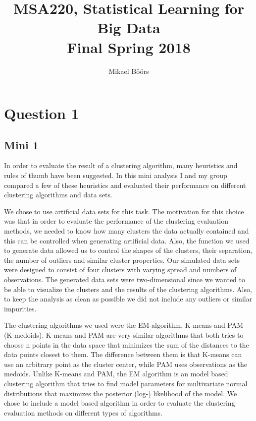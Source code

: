 \documentclass[11pt,twoside,swedish]{article}
\begin{document}
\title{MSA220, Statistical Learning for Big Data\\
  Final Spring 2018}
\author{Mikael B\"o\"ors}

\clearpage
\maketitle
\thispagestyle{empty}

\newpage
\clearpage
\tableofcontents
\thispagestyle{empty}
\newpage

\setcounter{page}{1}

\section{Question 1}\label{Question 1}

\subsection{Mini 1}\label{Mini 1}

In order to evaluate the result of a clustering algorithm, many heuristics and
rules of thumb have been suggested. In this mini analysis I and my
group compared a few of these heuristics and evaluated their
performance on different clustering algorithms and data sets.

We chose to use artificial data sets for this task. The motivation for
this choice was that in order to evaluate the performance of the
clustering evaluation methods, we needed to know how many clusters the
data actually contained and this can be controlled when generating
artificial data. Also, the function we used to generate data allowed
us to control the shapes of the clusters, their separation, the number
of outliers and similar cluster properties. Our simulated data sets
were designed to consist of four clusters with varying spread and
numbers of observations. The generated data sets were two-dimensional
since we wanted to be able to visualize the clusters and the results
of the clustering algorithms. Also, to keep the analysis as clean as
possible we did not include any outliers or similar impurities.

The clustering algorithms we used were the EM-algorithm, K-means and
PAM (K-medoids). K-means and PAM are very similar algorithms that both
tries to choose n points in the data space that minimizes the sum of the
distances to the data points closest to them. The difference between
them is that K-means can use an arbitrary point as the cluster center,
while PAM uses observations as the medoids. Unlike K-means and PAM,
the EM algorithm is an model based clustering algorithm that tries to
find model parameters for multivariate normal distributions that
maximizes the posterior (log-) likelihood of the model. We chose to
include a model based algorithm in order to evaluate the clustering
evaluation methods on different types of algorithms.
\end{document}
